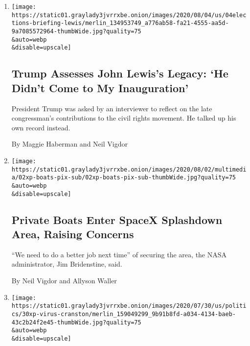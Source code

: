 \begin{enumerate}
\def\labelenumi{\arabic{enumi}.}
\item
  \href{/2020/08/04/us/politics/trump-john-lewis-axios.html}{}

  \texttt{[image: https://static01.graylady3jvrrxbe.onion/images/2020/08/04/us/04elections-briefing-lewis/merlin\_134953749\_a776ab58-fa21-4555-aa5d-9a7085572964-thumbWide.jpg?quality=75\\\&auto=webp\\\&disable=upscale]}

  \hypertarget{trump-assesses-john-lewiss-legacy-he-didnt-come-to-my-inauguration}{%
  \subsection{Trump Assesses John Lewis's Legacy: `He Didn't Come to My
  Inauguration'}\label{trump-assesses-john-lewiss-legacy-he-didnt-come-to-my-inauguration}}

  President Trump was asked by an interviewer to reflect on the late
  congressman's contributions to the civil rights movement. He talked up
  his own record instead.

  By Maggie Haberman and Neil Vigdor
\item
  \href{/2020/08/02/us/flag-boat-SpaceX.html}{}

  \texttt{[image: https://static01.graylady3jvrrxbe.onion/images/2020/08/02/multimedia/02xp-boats-pix-sub/02xp-boats-pix-sub-thumbWide.jpg?quality=75\\\&auto=webp\\\&disable=upscale]}

  \hypertarget{private-boats-enter-spacex-splashdown-area-raising-concerns}{%
  \subsection{Private Boats Enter SpaceX Splashdown Area, Raising
  Concerns}\label{private-boats-enter-spacex-splashdown-area-raising-concerns}}

  ``We need to do a better job next time'' of securing the area, the
  NASA administrator, Jim Bridenstine, said.

  By Neil Vigdor and Allyson Waller
\item
  \href{/2020/07/31/arts/television/bryan-cranston-coronavirus-plasma.html}{}

  \texttt{[image: https://static01.graylady3jvrrxbe.onion/images/2020/07/30/us/politics/30xp-virus-cranston/merlin\_159049299\_9b91b8fd-a034-4134-baeb-43c2b24f2e45-thumbWide.jpg?quality=75\\\&auto=webp\\\&disable=upscale]}

  \hypertarget{bryan-cranston-star-of-breaking-bad-says-hes-recovered-from-the-coronavirus}{%
}
\end{enumerate}
